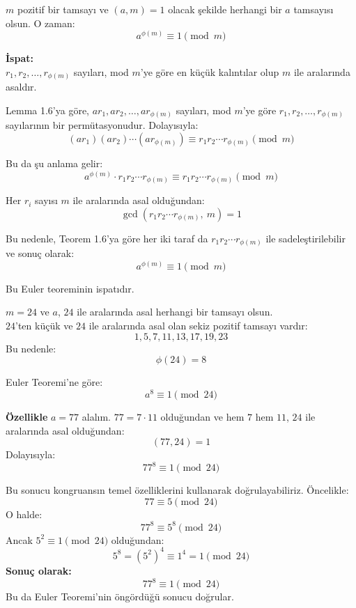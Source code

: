 \documentclass[12pt]{article}
\begin{document}
\begin{tcolorbox}[colback=green!5, colframe=green!50!black, title=\textbf{Teorem 1.15 (Euler Teoremi)}, fonttitle=\bfseries, sharp corners]
$m$ pozitif bir tamsayı ve $(a, m) = 1$ olacak şekilde herhangi bir $a$ tamsayısı olsun. O zaman:
\[
a^{\phi(m)} \equiv 1 \pmod{m}
\]

\textbf{İspat:} \\
$r_1, r_2, \ldots, r_{\phi(m)}$ sayıları, mod $m$'ye göre en küçük kalıntılar olup $m$ ile aralarında asaldır.

Lemma 1.6'ya göre, $ar_1, ar_2, \ldots, ar_{\phi(m)}$ sayıları, mod $m$'ye göre $r_1, r_2, \ldots, r_{\phi(m)}$ sayılarının bir permütasyonudur. Dolayısıyla:
\[
(ar_1)(ar_2) \cdots (ar_{\phi(m)}) \equiv r_1 r_2 \cdots r_{\phi(m)} \pmod{m}
\]

Bu da şu anlama gelir:
\[
a^{\phi(m)} \cdot r_1 r_2 \cdots r_{\phi(m)} \equiv r_1 r_2 \cdots r_{\phi(m)} \pmod{m}
\]

Her $r_i$ sayısı $m$ ile aralarında asal olduğundan:
\[
\gcd(r_1 r_2 \cdots r_{\phi(m)},\ m) = 1
\]

Bu nedenle, Teorem 1.6'ya göre her iki taraf da $r_1 r_2 \cdots r_{\phi(m)}$ ile sadeleştirilebilir ve sonuç olarak:
\[
a^{\phi(m)} \equiv 1 \pmod{m}
\]

Bu Euler teoreminin ispatıdır.
\end{tcolorbox}

\vspace{2em}

\begin{tcolorbox}[colback=gray!5, colframe=gray!60!black, title=\textbf{Örnek 1.24: Euler Teoreminin Uygulaması}, fonttitle=\bfseries, sharp corners]

$m = 24$ ve $a$, $24$ ile aralarında asal herhangi bir tamsayı olsun. \\

$24$'ten küçük ve $24$ ile aralarında asal olan sekiz pozitif tamsayı vardır: 
\[
1, 5, 7, 11, 13, 17, 19, 23
\]
Bu nedenle:
\[
\phi(24) = 8
\]

Euler Teoremi'ne göre:
\[
a^8 \equiv 1 \pmod{24}
\]

\textbf{Özellikle} $a = 77$ alalım. $77 = 7 \cdot 11$ olduğundan ve hem $7$ hem $11$, $24$ ile aralarında asal olduğundan:
\[
(77, 24) = 1
\]
Dolayısıyla:
\[
77^8 \equiv 1 \pmod{24}
\]

Bu sonucu kongruansın temel özelliklerini kullanarak doğrulayabiliriz. Öncelikle:
\[
77 \equiv 5 \pmod{24}
\]
O halde:
\[
77^8 \equiv 5^8 \pmod{24}
\]
Ancak $5^2 \equiv 1 \pmod{24}$ olduğundan:
\[
5^8 = (5^2)^4 \equiv 1^4 = 1 \pmod{24}
\]
\textbf{Sonuç olarak:}
\[
77^8 \equiv 1 \pmod{24}
\]
Bu da Euler Teoremi'nin öngördüğü sonucu doğrular.
\end{tcolorbox}
\end{document}
